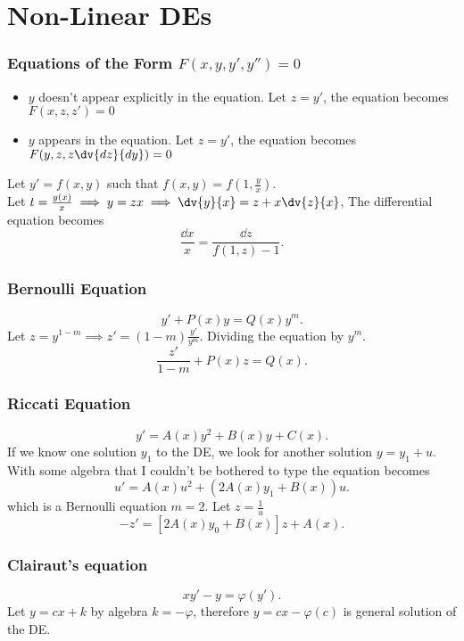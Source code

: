 \part{Non-Linear DEs}
\section{Equations of the Form $F(x,y,y',y'')=0$}
\begin{itemize}
	\item $y$ doesn't appear explicitly in the equation. Let $z=y'$, the equation becomes $F(x,z,z')=0$
	\item $y$ appears in the equation. Let $z=y'$, the equation becomes $F(y,z,z\dv{dz}{dy})=0$
\end{itemize}

\begin{remark}
	Let $y'=f(x,y)$ such that $f(x,y) = f(1,\frac{y}{x})$.\\
	Let $t=\frac{y(x)}{x}\implies y=zx\implies \dv{y}{x}=z+x\dv{z}{x}$, The differential equation becomes
	\[
		\frac{\dd{x}}{x} = \frac{\dd{z}}{f(1,z)-1}
		.\]
\end{remark}

\section{Bernoulli Equation}
\[
	y' + P(x)y = Q(x)y^m
	.\]
Let $z=y^{1-m}\implies z'=(1-m)\frac{y'}{y^m}$. Dividing the equation by $y^m$.
\[
	\frac{z'}{1-m}+P(x)z = Q(x)
	.\]

\section{Riccati Equation}
\[
	y'=A(x)y^2+B(x)y+C(x)
	.\]
If we know one solution $y_1$ to the DE, we look for another solution $y=y_1 + u$. With some algebra that I couldn't be bothered to type the equation becomes
\[
	u'=A(x)u^2+(2A(x)y_1 + B(x))u
	.\]
which is a Bernoulli equation $m=2$. Let $z=\frac{1}{u}$
\[
	-z'=\left[2A(x)y_0+B(x)\right]z + A(x)
	.\]

\section{Clairaut's equation}
\[
	xy'-y=\varphi(y')
	.\]
Let $y=cx+k$ by algebra $k=-\varphi$, therefore $y=cx-\varphi(c)$ is general solution of the DE.
